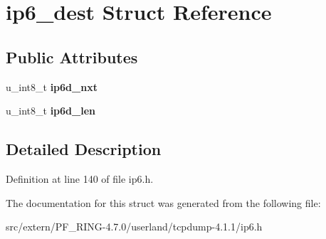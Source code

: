 \hypertarget{structip6__dest}{
\section{ip6\_\-dest Struct Reference}
\label{structip6__dest}
}
\subsection*{Public Attributes}
\begin{DoxyCompactItemize}
\item 
\hypertarget{structip6__dest_aea2303632214f2e7820ee4d3e584d733}{
u\_\-int8\_\-t {\bfseries ip6d\_\-nxt}}
\label{structip6__dest_aea2303632214f2e7820ee4d3e584d733}

\item 
\hypertarget{structip6__dest_ac9d257463257338684c6f42557c9eef1}{
u\_\-int8\_\-t {\bfseries ip6d\_\-len}}
\label{structip6__dest_ac9d257463257338684c6f42557c9eef1}

\end{DoxyCompactItemize}


\subsection{Detailed Description}


Definition at line 140 of file ip6.h.



The documentation for this struct was generated from the following file:\begin{DoxyCompactItemize}
\item 
src/extern/PF\_\-RING-\/4.7.0/userland/tcpdump-\/4.1.1/ip6.h\end{DoxyCompactItemize}
